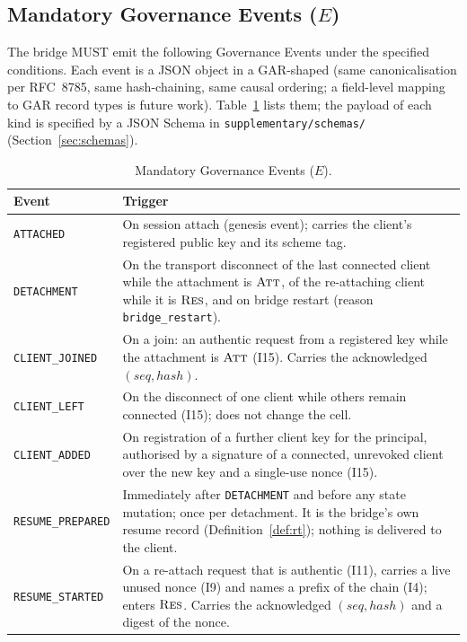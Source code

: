 \subsection{Mandatory Governance Events ($E$)}

The bridge MUST emit the following Governance Events under the specified
conditions. Each event is a JSON object in a GAR-shaped
(same canonicalisation per RFC~8785, same hash-chaining, same causal
ordering; a field-level mapping to GAR record types is future work).
Table~\ref{tab:events} lists them; the payload of each kind is specified
by a JSON Schema in \texttt{supplementary/schemas/} (Section~\ref{sec:schemas}).

\begin{longtable}{p{} p{}}
\caption{Mandatory Governance Events ($E$).}\label{tab:events}\\
\toprule
\textbf{Event} & \textbf{Trigger} \\
\midrule
\texttt{ATTACHED} & On session attach (genesis event); carries the
client's registered public key and its scheme tag. \\
\texttt{DETACHMENT} & On the transport disconnect of the last connected
client while the attachment is $\textsc{Att}$, of the re-attaching client
while it is $\textsc{Res}$, and on bridge restart (reason
\texttt{bridge\_restart}). \\
\texttt{CLIENT\_JOINED} & On a join: an authentic request from a
registered key while the attachment is $\textsc{Att}$ (I15). Carries the
acknowledged $(\mathit{seq}, \mathit{hash})$. \\
\texttt{CLIENT\_LEFT} & On the disconnect of one client while others
remain connected (I15); does not change the cell. \\
\texttt{CLIENT\_ADDED} & On registration of a further client key for the
principal, authorised by a signature of a connected, unrevoked client
over the new key and a single-use nonce (I15). \\
\texttt{RESUME\_PREPARED} & Immediately after \texttt{DETACHMENT}
and before any state mutation; once per detachment. It is the bridge's
own resume record (Definition~\ref{def:rt}); nothing is delivered to the
client. \\
\texttt{RESUME\_STARTED} & On a re-attach request that is authentic
(I11), carries a live unused nonce (I9) and names a prefix of the chain
(I4); enters $\textsc{Res}$. Carries the acknowledged
$(\mathit{seq}, \mathit{hash})$ and a digest of the nonce. \\

\end{longtable}
